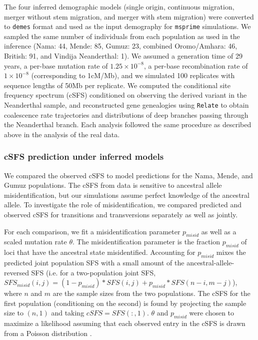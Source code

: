 \documentclass[]{article}
\newcommand{\Relate}{\texttt{Relate}\xspace}
\newcommand{\msprime}{\texttt{msprime}\xspace}
\newcommand{\demes}{\texttt{demes}\xspace}
\begin{document}
The four inferred demographic models (single origin, continuous migration,
merger without stem migration, and merger with stem migration) were converted
to \demes format \citep{Gower2022-yn} and used as
the input demography for \msprime simulations. We sampled the same
number of individuals from each population as used in the inference (Nama: 44,
Mende: 85, Gumuz: 23, combined Oromo/Amhara: 46, British: 91, and Vindija
Neanderthal: 1). We assumed a generation time of 29 years, a per-base mutation
rate of $1.25\times10^{-8}$, a per-base recombination rate of $1\times10^{-8}$
(corresponding to 1cM/Mb), and we simulated 100 replicates with sequence
lengths of 50Mb per replicate. We computed the conditional site frequency
spectrum (cSFS) conditioned on observing the derived variant in the Neanderthal
sample, and reconstructed gene genealogies using \Relate to obtain coalescence
rate trajectories and distributions of deep branches passing through the
Neanderthal branch. Each analysis followed the same procedure as described
above in the analysis of the real data.

\subsubsection{cSFS prediction under inferred models}

We compared the observed cSFS to model predictions for the Nama, Mende, and
Gumuz populations. The cSFS from data is sensitive to ancestral allele
misidentification, but our simulations assume perfect knowledge of the
ancestral allele. To investigate the role of misidentification, we compared
predicted and observed cSFS for transitions and transversions separately as
well as jointly.

For each comparison, we fit a misidentification parameter $p_{misid}$ as well
as a scaled mutation rate $\theta$. The misidentification parameter is the
fraction $p_{misid}$ of loci that have the ancestral state misidentified.
Accounting for $p_{misid}$ mixes the predicted joint population SFS with a
small amount of the ancestral-allele-reversed SFS (i.e. for a two-population
joint SFS, $SFS_{misid}(i, j)=(1-p_{misid})*SFS(i, j) + p_{misid}*SFS(n-i,
m-j)$), where $n$ and $m$ are the sample sizes from the two populations. The
cSFS for the first population (conditioning on the second) is found by
projecting the sample size to $(n, 1)$ and taking $cSFS=SFS(:,1)$. $\theta$ and
$p_{misid}$ were chosen to maximize a likelihood assuming that each observed
entry in the cSFS is drawn from a Poisson distribution \citep{Sawyer1992-rt}.
\end{document}
